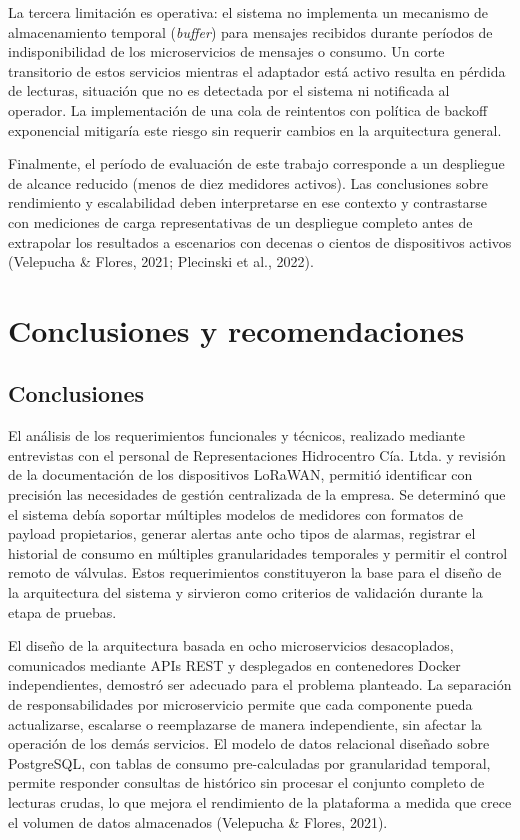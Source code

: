 \documentclass[12pt,a4paper,oneside]{report}
\begin{document}
La tercera limitación es operativa: el sistema no implementa un mecanismo de almacenamiento temporal (\textit{buffer}) para mensajes recibidos durante períodos de indisponibilidad de los microservicios de mensajes o consumo. Un corte transitorio de estos servicios mientras el adaptador está activo resulta en pérdida de lecturas, situación que no es detectada por el sistema ni notificada al operador. La implementación de una cola de reintentos con política de backoff exponencial mitigaría este riesgo sin requerir cambios en la arquitectura general.

Finalmente, el período de evaluación de este trabajo corresponde a un despliegue de alcance reducido (menos de diez medidores activos). Las conclusiones sobre rendimiento y escalabilidad deben interpretarse en ese contexto y contrastarse con mediciones de carga representativas de un despliegue completo antes de extrapolar los resultados a escenarios con decenas o cientos de dispositivos activos (Velepucha \& Flores, 2021; Plecinski et al., 2022).

\chapter{Conclusiones y recomendaciones}

\section{Conclusiones}\label{conclusiones}

El análisis de los requerimientos funcionales y técnicos, realizado mediante entrevistas con el personal de Representaciones Hidrocentro Cía. Ltda. y revisión de la documentación de los dispositivos LoRaWAN, permitió identificar con precisión las necesidades de gestión centralizada de la empresa. Se determinó que el sistema debía soportar múltiples modelos de medidores con formatos de payload propietarios, generar alertas ante ocho tipos de alarmas, registrar el historial de consumo en múltiples granularidades temporales y permitir el control remoto de válvulas. Estos requerimientos constituyeron la base para el diseño de la arquitectura del sistema y sirvieron como criterios de validación durante la etapa de pruebas.

El diseño de la arquitectura basada en ocho microservicios desacoplados, comunicados mediante APIs REST y desplegados en contenedores Docker independientes, demostró ser adecuado para el problema planteado. La separación de responsabilidades por microservicio permite que cada componente pueda actualizarse, escalarse o reemplazarse de manera independiente, sin afectar la operación de los demás servicios. El modelo de datos relacional diseñado sobre PostgreSQL, con tablas de consumo pre-calculadas por granularidad temporal, permite responder consultas de histórico sin procesar el conjunto completo de lecturas crudas, lo que mejora el rendimiento de la plataforma a medida que crece el volumen de datos almacenados (Velepucha \& Flores, 2021).
\end{document}

